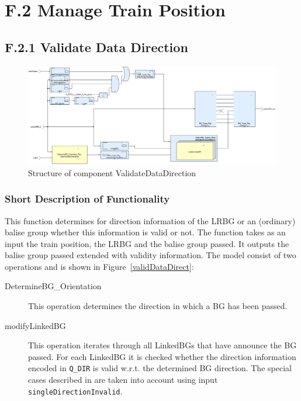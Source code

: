 \documentclass{template/openetcs_report}
\begin{document}
\section{F.2 Manage Train Position}


\subsection{F.2.1 Validate Data Direction}

\begin{figure}[ht]
\centering
\includegraphics[width=\textwidth]{../images/ValidateDataDirection.PNG}
\caption{Structure of component ValidateDataDirection}\label{fig:validDataDirect}
\end{figure}

\subsubsection{Short Description of Functionality}
This function determines for direction information of the LRBG or an (ordinary) balise group whether this information is valid or not. The function takes as an input the train position, the LRBG and the balise group passed. It outputs the balise group passed extended with validity information. The model consist of two operations and is shown in Figure~\ref{validDataDirect}:
\begin{description}
	\item[DetermineBG\_Orientation] This operation determines the direction in which a BG has been passed.
	\item[modifyLinkedBG] This operation iterates through all LinkedBGs that have announce the BG passed. For each LinkedBG it is checked whether the direction information encoded in \verb+Q_DIR+ is valid w.r.t. the determined BG direction. The special cases described in \cite[Chapter~3.6.3.1.3.1, 3.6.3.1.4]{subset-026} are taken into account using input \verb+singleDirectionInvalid+.
\end{description}
\end{document}
